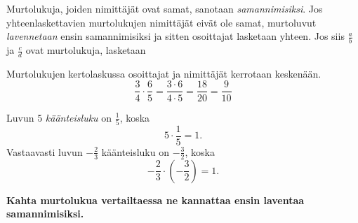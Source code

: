     Murtolukuja, joiden nimittäjät ovat samat, sanotaan \emph{samannimisiksi}.
    Jos yhteenlaskettavien murtolukujen nimittäjät eivät ole samat, murtoluvut
    \emph{lavennetaan} ensin samannimisiksi ja sitten osoittajat lasketaan yhteen.
    Jos siis $\frac{a}{b}$ ja $\frac{c}{d}$ ovat murtolukuja, lasketaan


\begin{esimerkki}
        Murtolukujen kertolaskussa osoittajat ja nimittäjät kerrotaan keskenään.
      \[
        \frac{3}{4}\cdot \frac{6}{5}= \frac{3\cdot 6}{4\cdot 5}= \frac{18}{20}=\frac{9}{10}
        \]
    \end{esimerkki}


\begin{esimerkki}
	Luvun $5$ \emph{käänteisluku} on $\frac{1}{5}$, koska
	\[
	 5\cdot \frac{1}{5}=1.
	\]
	Vastaavasti luvun $-\frac{2}{3}$ käänteisluku on $-\frac{3}{2}$, koska
	\[
	 -\frac{2}{3}\cdot (-\frac{3}{2})=1.
	\]

\end{esimerkki}
    \textbf{Kahta murtolukua vertailtaessa ne kannattaa ensin laventaa samannimisiksi.}
    
